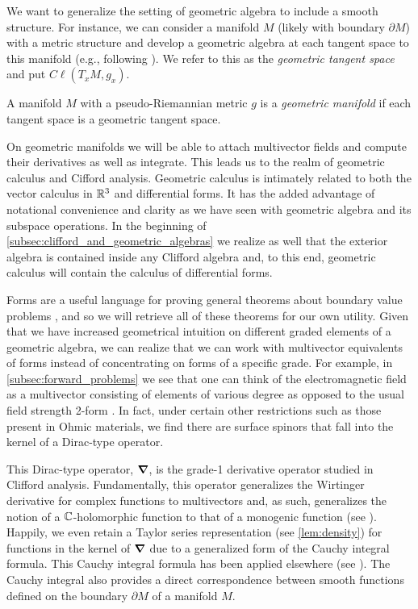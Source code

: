 We want to generalize the setting of geometric algebra to include a smooth structure. For instance, we can consider a manifold $M$ (likely with boundary $\partial M$) with a metric structure and develop a geometric algebra at each tangent space to this manifold (e.g., following \cite{schindler_geometric_2020}). We refer to this as the \emph{geometric tangent space} and put $C\ell(T_xM,g_x)$.
\begin{definition}
A manifold $M$ with a pseudo-Riemannian metric $g$ is a \emph{geometric manifold} if each tangent space is a geometric tangent space.
\end{definition}
On geometric manifolds we will be able to attach multivector fields and compute their derivatives as well as integrate. This leads us to the realm of geometric calculus and Cifford analysis. Geometric calculus is intimately related to both the vector calculus in $\mathbb{R}^3$ and differential forms. It has the added advantage of notational convenience and clarity as we have seen with geometric algebra and its subspace operations. In the beginning of \cref{subsec:clifford_and_geometric_algebras} we realize as well that the exterior algebra is contained inside any Clifford algebra and, to this end, geometric calculus will contain the calculus of differential forms. 

Forms are a useful language for proving general theorems about boundary value problems \cite{schwarz_hodge_1995}, and so we will retrieve all of these theorems for our own utility. Given that we have increased geometrical intuition on different graded elements of a geometric algebra, we can realize that we can work with multivector equivalents of forms instead of concentrating on forms of a specific grade. For example, in \cref{subsec:forward_problems} we see that one can think of the electromagnetic field as a multivector consisting of elements of various degree as opposed to the usual field strength 2-form \cite{warnick_dierential_2014}. In fact, under certain other restrictions such as those present in Ohmic materials, we find there are surface spinors that fall into the kernel of a Dirac-type operator.

This Dirac-type operator, $\boldsymbol{\nabla}$, is the grade-1 derivative operator studied in Clifford analysis. Fundamentally, this operator generalizes the Wirtinger derivative for complex functions to multivectors and, as such, generalizes the notion of a $\mathbb{C}$-holomorphic function to that of a monogenic function (see ). Happily, we even retain a Taylor series representation (see \cref{lem:density}) for functions in the kernel of $\boldsymbol{\nabla}$ due to a generalized form of the Cauchy integral formula. This Cauchy integral formula has been applied elsewhere (see \cite{brackx_hilbert_2008}). The Cauchy integral also provides a direct correspondence between smooth functions defined on the boundary $\partial M$ of a manifold $M$. 

